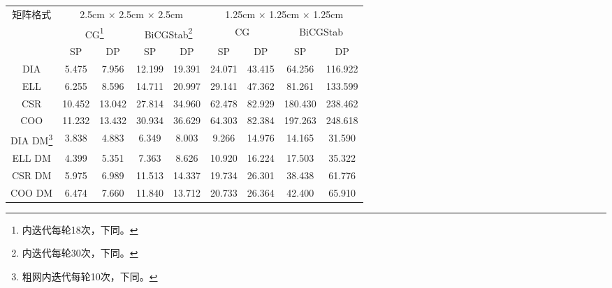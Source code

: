 \begin{sidewaystable}
\pdfrotate
\centering
\begin{minipage}{.8\linewidth}
\centering
\caption[不同稀疏矩阵格式求解三维临界扩散的时间表]
{\label{tab:equsolve.spformat}%
不同稀疏矩阵格式求解三维临界扩散的时间表(单位:s)%
\footnote{不同的存储格式对非零元有着不同的求和顺序，由于浮点误差存在，%
不同的格式要达到收敛标准所需要的迭代次数可能有差别，并导致总计算时间的改变。}
}
\begin{tabular}{ccccccccc}
\toprule
 \multirow {3}{*}{矩阵格式}  &
       \multicolumn{4}{c}{2.5cm $\times$ 2.5cm $\times$ 2.5cm}
       &\multicolumn{4}{c}{1.25cm $\times$ 1.25cm $\times$ 1.25cm} \\
 &\multicolumn{2}{c}{CG\footnote{内迭代每轮18次，下同。}}
 	   &\multicolumn{2}{c}{BiCGStab\footnote{内迭代每轮30次，下同。}}
       & \multicolumn{2}{c}{CG}& \multicolumn{2}{c}{BiCGStab}\\
 & SP& DP& SP& DP& SP& DP& SP& DP\\
\midrule
 DIA&  5.475&  7.956& 12.199& 19.391& 24.071& 43.415&  64.256& 116.922\\
 ELL&  6.255&  8.596& 14.711& 20.997& 29.141& 47.362&  81.261& 133.599\\
 CSR& 10.452& 13.042& 27.814& 34.960& 62.478& 82.929& 180.430& 238.462\\
 COO& 11.232& 13.432& 30.934& 36.629& 64.303& 82.384& 197.263& 248.618\\
 DIA DM\footnote{粗网内迭代每轮10次，下同。}
       &  3.838&  4.883&  6.349&  8.003&  9.266& 14.976&  14.165&  31.590\\
 ELL DM&  4.399&  5.351&  7.363&  8.626& 10.920& 16.224&  17.503&  35.322\\
 CSR DM&  5.975&  6.989& 11.513& 14.337& 19.734& 26.301&  38.438&  61.776\\
 COO DM&  6.474&  7.660& 11.840& 13.712& 20.733& 26.364&  42.400&  65.910\\
\bottomrule
\end{tabular}
\end{minipage}
\end{sidewaystable}

